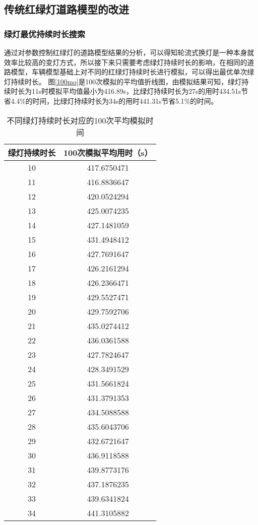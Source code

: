 \documentclass[a4paper,12pt]{article}
\numberwithin{equation}{section}
\begin{document}
		\subsection{传统红绿灯道路模型的改进}
		\subsubsection{绿灯最优持续时长搜索}
		通过对参数控制红绿灯的道路模型结果的分析，可以得知轮流式换灯是一种本身就效率比较高的变灯方式，所以接下来只需要考虑绿灯持续时长的影响，在相同的道路模型，车辆模型基础上对不同的红绿灯持续时长进行模拟，可以得出最优单次绿灯持续时长。
		图\ref{100mo}是100次模拟的平均值折线图，由模拟结果可知，绿灯持续时长为11s时模拟平均值最小为416.89s，比绿灯持续时长为27s的用时434.51s节省4.4\%的时间，比绿灯持续时长为34s的用时441.31s节省5.1\%的时间。
		\begin{table}[H]
			\centering
			\caption{不同绿灯持续时长对应的100次平均模拟时间}
			\begin{tabular}{|c|c|}
				\hline
				绿灯持续时长 & 100次模拟平均用时（s） \\ \hline
				10 & 417.6750471 \\ \hline
				11 & 416.8836647 \\ \hline
				12 & 420.0524294 \\ \hline
				13 & 425.0074235 \\ \hline
				14 & 427.1481059 \\ \hline
				15 & 431.4948412 \\ \hline
				16 & 427.7691647 \\ \hline
				17 & 426.2161294 \\ \hline
				18 & 426.2366471 \\ \hline
				19 & 429.5527471 \\ \hline
				20 & 429.7592706 \\ \hline
				21 & 435.0274412 \\ \hline
				22 & 436.0361588 \\ \hline
				23 & 427.7824647 \\ \hline
				24 & 428.3491529 \\ \hline
				25 & 431.5661824 \\ \hline
				26 & 431.3791353 \\ \hline
				27 & 434.5088588 \\ \hline
				28 & 435.6043706 \\ \hline
				29 & 432.6721647 \\ \hline
				30 & 436.9118588 \\ \hline
				31 & 439.8773176 \\ \hline
				32 & 437.1876235 \\ \hline
				33 & 439.6341824 \\ \hline
				34 & 441.3105882 \\ \hline
			\end{tabular}
		\end{table}
\end{document}
